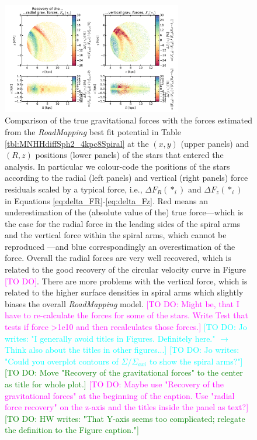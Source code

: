 \documentclass[iop,revtex4,numberedappendix,appendixfloats]{emulateapj}
\newcommand{\RM}{{\sl RoadMapping}}
\newcommand{\Wilma}[1]{\textcolor{Magenta}{#1}}
\newcommand{\HW}[1]{\textcolor{Green}{#1}}
\newcommand{\Jo}[1]{\textcolor{Cyan}{#1}}
\begin{document}
\begin{figure}[!htbp]
\centering
\includegraphics[width=0.7\textwidth]{fig/MNdHHdiffSph2_4kpc8Spiral_a_test1_forces_overview_6.pdf}
\caption{Comparison of the true gravitational forces with the forces estimated from the \RM{} best fit potential in Table \ref{tbl:MNHHdiffSph2_4kpc8Spiral} at the $(x,y)$ (upper panels) and $(R,z)$ positions (lower panels) of the stars that entered the analysis. In particular we colour-code the positions of the stars according to the radial (left panels) and vertical (right panels) force residuals scaled by a typical force, i.e., $\Delta F_R(*_i)$ and $\Delta F_z(*_i)$ in Equations \eqref{eq:delta_FR}-\eqref{eq:delta_Fz}. Red means an underestimation of the (absolute value of the)  true force---which is the case for the radial force in the leading sides of the spiral arms and the vertical force within the spiral arms, which cannot be reproduced ---and blue correspondingly an overestimation of the force. Overall the radial forces are very well recovered, which is related to the good recovery of the circular velocity curve in Figure \Wilma{[TO DO]}. There are more problems with the vertical force, which is related to the higher surface densities in spiral arms which slightly biases the overall \RM{} model. \Wilma{[TO DO: Might be, that I have to re-calculate the forces for some of the stars. Write Test that tests if force >1e10 and then recalculates those forces.]} \Jo{[TO DO: Jo writes: "I generally avoid titles in Figures. Definitely here." $\longrightarrow$ Think also about the titles in other figures...]} \Jo{[TO DO: Jo writes: "Could you overplot contours of $\Sigma/\Sigma_{axi}$ to show the spiral arms?"]} \HW{[TO DO: Move "Recovery of the gravitational forces" to the center as title for whole plot.]} \Wilma{[TO DO: Maybe use "Recovery of the gravitational forces" at the beginning of the caption. Use "radial force recovery" on the z-axis and the titles inside the panel as text?]} \HW{[TO DO: HW writes: "That Y-axis seems too complicated; relegate the definition to the Figure caption."]}}
\label{fig:4kpc8Spiral_forces}
\end{figure}
\end{document}
